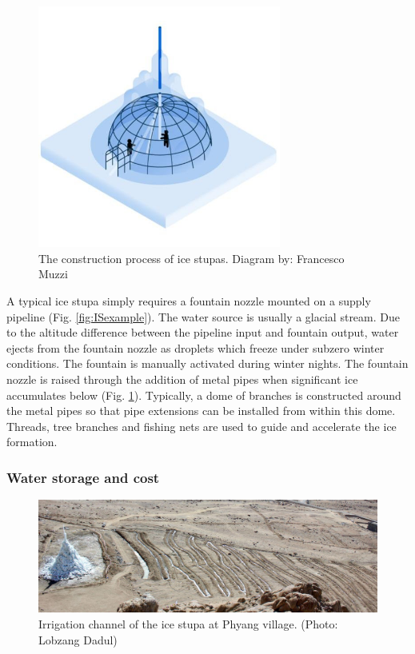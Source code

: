 \begin{figure}[htb]
	\centering
	\includegraphics[width=8cm]{figs/IS_science.jpg}
	\caption{The construction process of ice stupas. Diagram by: Francesco Muzzi }
	\label{fig:ISconstruction}
\end{figure}

A typical ice stupa simply requires a fountain nozzle mounted on a supply pipeline (Fig. \ref{fig:ISexample}).
The water source is usually a glacial stream. Due to the altitude difference between the pipeline input and
fountain output, water ejects from the fountain nozzle as droplets which freeze under subzero winter conditions.
The fountain is manually activated during winter nights. The fountain nozzle is raised through the addition of
metal pipes when significant ice accumulates below (Fig. \ref{fig:ISconstruction}). Typically, a dome of
branches is constructed around the metal pipes so that pipe extensions can be installed from within this dome.
Threads, tree branches and fishing nets are used to guide and accelerate the ice formation.

\subsubsection{Water storage and cost}
\label{sec:icestupa_irr}

\begin{figure}[htb]
	\centering
	\includegraphics[width=\textwidth]{figs/IS_irrigation.jpeg}
	\caption{Irrigation channel of the ice stupa at Phyang village. (Photo: Lobzang Dadul) }
	\label{fig:ISirrigation}
\end{figure}

